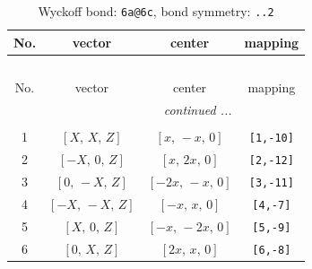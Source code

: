 \documentclass[fleqn,8pt]{jsarticle}
\begin{document}
\begin{longtable}{cccc}
\caption{Wyckoff bond: {\tt 6a@6c}, bond symmetry: {\tt ..2}}
 \\
 \hline \hline
No. & vector & center & mapping \\ \hline \endfirsthead

\multicolumn{3}{l}{\tablename\ \thetable{}} \\
 \hline \hline
No. & vector & center & mapping \\ \hline \endhead

 \hline \hline
\multicolumn{3}{r}{\footnotesize\it continued ...} \\ \endfoot

 \hline \hline
\multicolumn{3}{r}{} \\ \endlastfoot

1 & $\left[ X,\, X,\, Z \right]$ & $\left[ x,\, - x,\, 0 \right]$ & {\tt [1,-10]} \\ \hline
2 & $\left[ - X,\, 0,\, Z \right]$ & $\left[ x,\, 2 x,\, 0 \right]$ & {\tt [2,-12]} \\ \hline
3 & $\left[ 0,\, - X,\, Z \right]$ & $\left[ - 2 x,\, - x,\, 0 \right]$ & {\tt [3,-11]} \\ \hline
4 & $\left[ - X,\, - X,\, Z \right]$ & $\left[ - x,\, x,\, 0 \right]$ & {\tt [4,-7]} \\ \hline
5 & $\left[ X,\, 0,\, Z \right]$ & $\left[ - x,\, - 2 x,\, 0 \right]$ & {\tt [5,-9]} \\ \hline
6 & $\left[ 0,\, X,\, Z \right]$ & $\left[ 2 x,\, x,\, 0 \right]$ & {\tt [6,-8]} \\
\end{longtable}
\renewcommand{\arraystretch}{1.2}
\end{document}
